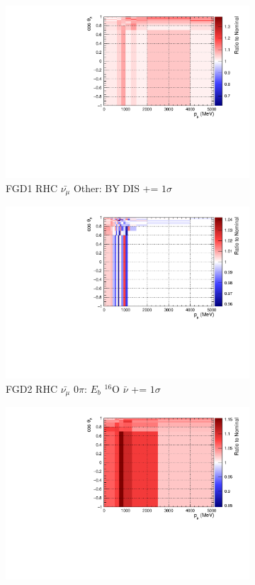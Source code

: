 \begin{figure}
\begin{subfigure}{.32\textwidth}
  \includegraphics[width=0.85\linewidth]{figs/sig/FGD1_anti-numuCC_other_CC_BY_DIS_+1sig.pdf}
  \caption{FGD1 RHC $\bar{\nu_{\mu}}$ Other: BY DIS += $1\sigma$}
  \label{fig:sigvar_FGD1_anti-numuCC_other}
\end{subfigure}
\centering
\begin{subfigure}{.32\textwidth}
  \centering
  \includegraphics[width=0.85\linewidth]{figs/sig/FGD2_anti-numuCC_0pi_EB_dial_O_nubar_+1sig.pdf}
  \caption{FGD2 RHC $\bar{\nu_{\mu}}$ 0$\pi$: $E_{b}$ $^{16}$O $\bar{\nu}$ += $1\sigma$}
  \label{fig:sigvar_FGD2_anti-numuCC_0pi}
\end{subfigure}
\begin{subfigure}{.32\textwidth}
  \centering
  \includegraphics[width=0.85\linewidth]{figs/sig/FGD2_anti-numuCC_1pi_ISO_BKG_+1sig.pdf}

\end{subfigure}
\end{figure}
